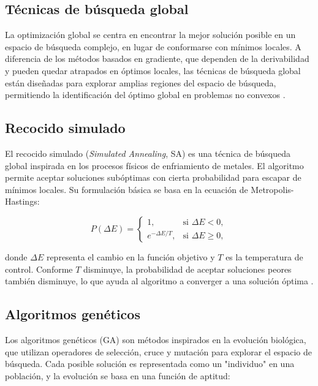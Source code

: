 \begin{itemize}
		\section{Técnicas de búsqueda global}
		
		La optimización global se centra en encontrar la mejor solución posible en un espacio de búsqueda complejo, en lugar de conformarse con mínimos locales. A diferencia de los métodos basados en gradiente, que dependen de la derivabilidad y pueden quedar atrapados en óptimos locales, las técnicas de búsqueda global están diseñadas para explorar amplias regiones del espacio de búsqueda, permitiendo la identificación del óptimo global en problemas no convexos \cite{floudas2013deterministic}.
		
		\subsection{Recocido simulado}
		
		El recocido simulado (\textit{Simulated Annealing}, SA) es una técnica de búsqueda global inspirada en los procesos físicos de enfriamiento de metales. El algoritmo permite aceptar soluciones subóptimas con cierta probabilidad para escapar de mínimos locales. Su formulación básica se basa en la ecuación de Metropolis-Hastings:
		
		\begin{equation}
			P(\Delta E) = 
			\begin{cases} 
				1, & \text{si } \Delta E < 0, \\
				e^{-\Delta E / T}, & \text{si } \Delta E \geq 0,
			\end{cases}
		\end{equation}
		
		donde \(\Delta E\) representa el cambio en la función objetivo y \(T\) es la temperatura de control. Conforme \(T\) disminuye, la probabilidad de aceptar soluciones peores también disminuye, lo que ayuda al algoritmo a converger a una solución óptima \cite{kirkpatrick1983optimization}.
		
		\subsection{Algoritmos genéticos}
		
		Los algoritmos genéticos (GA) son métodos inspirados en la evolución biológica, que utilizan operadores de selección, cruce y mutación para explorar el espacio de búsqueda. Cada posible solución es representada como un "individuo" en una población, y la evolución se basa en una función de aptitud:
		

\end{itemize}
